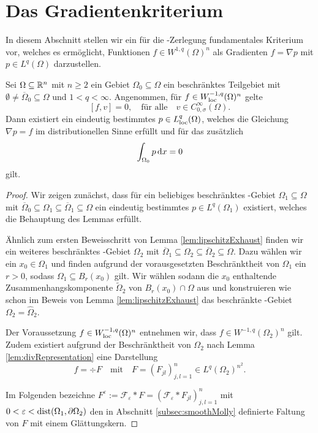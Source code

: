 \section{Das Gradientenkriterium}

In diesem Abschnitt stellen wir ein für die \helmholtz\hyp{}Zerlegung fundamentales Kriterium vor, welches es ermöglicht, Funktionen $f \in W^{1,q}(\Omega)^n$ als Gradienten $f = \nabla p$ mit $p \in L^q(\Omega)$ darzustellen.

\begin{lem}
  Sei $\Omega \subseteq \mathbb{R}^n$ mit $n \geq 2$ ein Gebiet $\Omega_0 \subseteq \Omega$ ein beschränktes Teilgebiet mit $\emptyset \neq \overline\Omega_0 \subseteq \Omega$ und $1 < q < \infty$.
  Angenommen, für $f \in W_{\operatorname{loc}}^{-1,q}(\Omega)^n$ gelte
  \begin{equation}
    \label{eq:vKernel}
    [f,v] = 0, \quad \text{für alle} \quad v \in C_{0,\sigma}^\infty(\Omega).
  \end{equation}
  Dann existiert ein eindeutig bestimmtes $p \in L^q_{\operatorname{loc}}(\Omega)$, welches die Gleichung $\nabla p = f$ im distributionellen Sinne erfüllt und für das zusätzlich
  \begin{equation}
    \int_{\Omega_0} p \, {\operatorname{d}\!{x}} = 0
    \label{eq:0integral}
  \end{equation}
  gilt.
\end{lem}

\begin{proof}
  Wir zeigen zunächst, dass für ein beliebiges beschränktes \lipschitz\hyp{}Gebiet $\Omega_1 \subseteq \Omega$ mit $\overline\Omega_0 \subseteq \Omega_1 \subseteq \overline\Omega_1 \subseteq \Omega$ ein eindeutig bestimmtes $p \in L^q(\Omega_1)$ existiert, welches die Behauptung des Lemmas erfüllt.

  Ähnlich zum ersten Beweisschritt von Lemma \ref{lem:lipschitzExhaust} finden wir ein weiteres beschränktes \lipschitz\hyp{}Gebiet $\Omega_2$ mit $\overline\Omega_1 \subseteq \Omega_2 \subseteq \overline\Omega_2 \subseteq \Omega$.
  Dazu wählen wir ein $x_0 \in \Omega_1$ und finden aufgrund der vorausgesetzten Beschränktheit von $\Omega_1$ ein $r > 0$, sodass $\Omega_1 \subseteq B_r(x_0)$ gilt.
  Wir wählen sodann die $x_0$ enthaltende Zusammenhangskomponente $\widetilde\Omega_2$ von $B_r(x_0) \cap \Omega$ aus und konstruieren wie schon im Beweis von Lemma \ref{lem:lipschitzExhaust} das beschränkte \lipschitz\hyp{}Gebiet $\Omega_2 = \widehat\Omega_2$.

  Der Voraussetzung $f \in W_{\operatorname{loc}}^{-1,q}(\Omega)^n$ entnehmen wir, dass $f \in W^{-1,q}(\Omega_2)^n$ gilt. Zudem existiert aufgrund der Beschränktheit von $\Omega_2$ nach Lemma \ref{lem:divRepresentation} eine Darstellung
  $$
  f = \div F \quad\text{mit}\quad F = (F_{jl})_{j,l=1}^n \in L^q(\Omega_2)^{n^2}.
  $$

  Im Folgenden bezeichne $F^\varepsilon := \mathcal{F}_\varepsilon \ast F = (\mathcal{F}_\varepsilon \ast F_{jl})_{j,l=1}^n$ mit $0 < \varepsilon < \operatorname{dist}(\Omega_1, \partial\Omega_2)$ den in Abschnitt \ref{subsec:smoothMolly} definierte Faltung von $F$ mit einem Glättungskern.

\end{proof}
